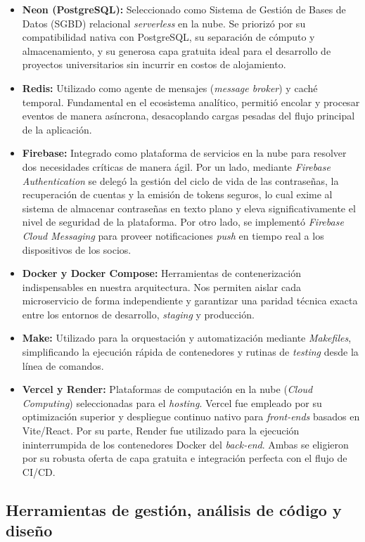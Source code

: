 \begin{itemize}
    \item \textbf{Neon (PostgreSQL):} Seleccionado como Sistema de Gestión de Bases de Datos (SGBD) relacional \textit{serverless} en la nube. Se priorizó por su compatibilidad nativa con PostgreSQL, su separación de cómputo y almacenamiento, y su generosa capa gratuita ideal para el desarrollo de proyectos universitarios sin incurrir en costos de alojamiento.
    \item \textbf{Redis:} Utilizado como agente de mensajes (\textit{message broker}) y caché temporal. Fundamental en el ecosistema analítico, permitió encolar y procesar eventos de manera asíncrona, desacoplando cargas pesadas del flujo principal de la aplicación.
    \item \textbf{Firebase:} Integrado como plataforma de servicios en la nube para resolver dos necesidades críticas de manera ágil. Por un lado, mediante \textit{Firebase Authentication} se delegó la gestión del ciclo de vida de las contraseñas, la recuperación de cuentas y la emisión de tokens seguros, lo cual exime al sistema de almacenar contraseñas en texto plano y eleva significativamente el nivel de seguridad de la plataforma. Por otro lado, se implementó \textit{Firebase Cloud Messaging} para proveer notificaciones \textit{push} en tiempo real a los dispositivos de los socios.
    \item \textbf{Docker y Docker Compose:} Herramientas de contenerización indispensables en nuestra arquitectura. Nos permiten aislar cada microservicio de forma independiente y garantizar una paridad técnica exacta entre los entornos de desarrollo, \textit{staging} y producción.
    \item \textbf{Make:} Utilizado para la orquestación y automatización mediante \textit{Makefiles}, simplificando la ejecución rápida de contenedores y rutinas de \textit{testing} desde la línea de comandos.
    \item \textbf{Vercel y Render:} Plataformas de computación en la nube (\textit{Cloud Computing}) seleccionadas para el \textit{hosting}. Vercel fue empleado por su optimización superior y despliegue continuo nativo para \textit{front-ends} basados en Vite/React. Por su parte, Render fue utilizado para la ejecución ininterrumpida de los contenedores Docker del \textit{back-end}. Ambas se eligieron por su robusta oferta de capa gratuita e integración perfecta con el flujo de CI/CD.
\end{itemize}

\subsection{Herramientas de gestión, análisis de código y diseño}

